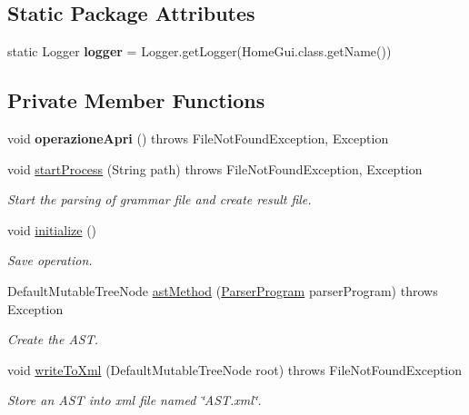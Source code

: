\subsection*{Static Package Attributes}
\begin{DoxyCompactItemize}
\item 
\hypertarget{class_home_gui_a6eef831dc2ff4533740f3395c4b9067a}{static Logger {\bfseries logger} = Logger.\-get\-Logger(Home\-Gui.\-class.\-get\-Name())}\label{class_home_gui_a6eef831dc2ff4533740f3395c4b9067a}

\end{DoxyCompactItemize}
\subsection*{Private Member Functions}
\begin{DoxyCompactItemize}
\item 
\hypertarget{class_home_gui_a8a91bfb188035012962b468a651f73a5}{void {\bfseries operazione\-Apri} ()  throws File\-Not\-Found\-Exception, Exception }\label{class_home_gui_a8a91bfb188035012962b468a651f73a5}

\item 
void \hyperlink{class_home_gui_a52f0602a97cd1ef63063bbbbda036d26}{start\-Process} (String path)  throws File\-Not\-Found\-Exception, Exception 
\begin{DoxyCompactList}\small\item\em Start the parsing of grammar file and create result file. \end{DoxyCompactList}\item 
void \hyperlink{class_home_gui_a5e935834d62fe14dfda2c9884f1f7010}{initialize} ()
\begin{DoxyCompactList}\small\item\em Save operation. \end{DoxyCompactList}\item 
Default\-Mutable\-Tree\-Node \hyperlink{class_home_gui_ac44ac869c6c437c200139d79f9f9b027}{ast\-Method} (\hyperlink{classparser_program_1_1_parser_program}{Parser\-Program} parser\-Program)  throws Exception 
\begin{DoxyCompactList}\small\item\em Create the A\-S\-T. \end{DoxyCompactList}\item 
void \hyperlink{class_home_gui_a0428d3c56abfafc769684835c1581f38}{write\-To\-Xml} (Default\-Mutable\-Tree\-Node root)  throws File\-Not\-Found\-Exception 
\begin{DoxyCompactList}\small\item\em Store an A\-S\-T into xml file named \char`\"{}\-A\-S\-T.\-xml\char`\"{}. \end{DoxyCompactList}\end{DoxyCompactItemize}
